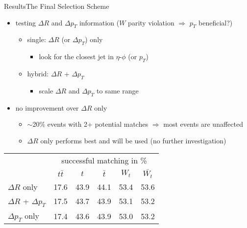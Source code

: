 \documentclass[9pt, aspectratio=169]{beamer}
\begin{document}
\begin{frame}{Results}{The Final Selection Scheme}
	\begin{itemize}
    	\item testing $\Delta R$ and $\Delta p_T$ information ($W$ parity violation $\Rightarrow$ $p_T$ beneficial?)  %
    	\begin{itemize}
			\item single: $\Delta R$ (or $\Delta p_T$) only
			\begin{itemize}
		  		\item look for the closest jet in $\eta$-$\phi$ (or $p_T$) 
			\end{itemize}
			\item hybrid: $\Delta R$ + $\Delta p_T$
			\begin{itemize}
				\item scale $\Delta R$ and $\Delta p_T$ to same range
			\end{itemize}
		\end{itemize}
    	\item no improvement over $\Delta R$ only
    	\begin{itemize}
      		\item $\sim$20\% events with 2+ potential matches $\Rightarrow$ most events are unaffected
			\item $\Delta R$ only performs best and will be used (no further investigation)
    	\end{itemize}
	\end{itemize}

	\begin{table}
		\centering
		\begin{tabular}{l|c|c|c|c|c|}
			&\multicolumn{5}{c|}{successful matching in \%}\\
			& $t\bar{t}$ & $t$ & $\bar{t}$ & $W_t$ & $\bar{W_t}$\\
			\hline
			\rowcolor{highlighter!40}
			$\Delta R$ only & 17.6 & 43.9 & 44.1 & 53.4 & 53.6\\
			$\Delta R$ + $\Delta p_T$ & 17.5 & 43.7 & 43.9 & 53.1 & 53.2\\
			$\Delta p_T$ only & 17.4 & 43.6 & 43.9 & 53.0 & 53.2\\
		\end{tabular}
	\end{table}
\end{frame}
\end{document}
